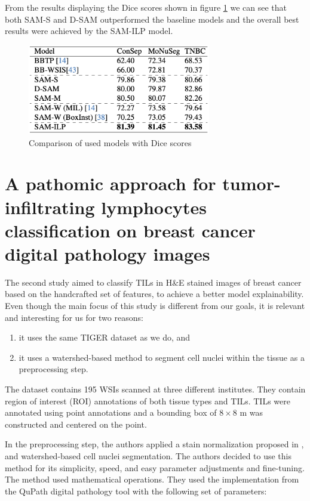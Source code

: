 From the results displaying the Dice scores shown in figure \ref{fig:rw-sam-dice} we can see that both SAM-S and D-SAM outperformed the baseline models and the overall best results were achieved by the SAM-ILP model.

\begin{figure}[H]
    \begin{centering}
    \includegraphics[width=8cm]{assets/images/rw-table-dice.png}
    \par\end{centering}
    \caption{Comparison of used models with Dice scores}
    \label{fig:rw-sam-dice}
\end{figure}

\section{A pathomic approach for tumor-infiltrating lymphocytes classification on breast cancer digital pathology images \cite{Verdicchio2023}}
\label{section:related-2}

The second study aimed to classify TILs in H\&E stained images of breast cancer based on the handcrafted set of features, to achieve a better model explainability. Even though the main focus of this study is different from our goals, it is relevant and interesting for us for two reasons:

\begin{enumerate}
    \item it uses the same TIGER dataset \cite{tiger_dataset} as we do, and
    \item it uses a watershed-based method to segment cell nuclei within the tissue as a preprocessing step.
\end{enumerate}

The dataset contains 195 WSIs scanned at three different institutes. They contain region of interest (ROI) annotations of both tissue types and TILs. TILs were annotated using point annotations and a bounding box of $8 \!\times\! 8$ \textmu m was constructed and centered on the point.

In the preprocessing step, the authors applied a stain normalization proposed in \cite{Vahadane2015}, and watershed-based cell nuclei segmentation. The authors decided to use this method for its simplicity, speed, and easy parameter adjustments and fine-tuning. The method used mathematical operations. They used the implementation from the QuPath digital pathology tool with the following set of parameters:

